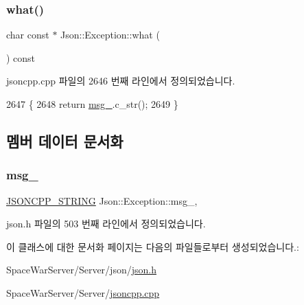 \subsubsection{\texorpdfstring{what()}{what()}}
{\footnotesize\ttfamily char const  $\ast$ Json\+::\+Exception\+::what (\begin{DoxyParamCaption}{ }\end{DoxyParamCaption}) const\hspace{0.3cm}{\ttfamily [inherited]}}



jsoncpp.\+cpp 파일의 2646 번째 라인에서 정의되었습니다.


\begin{DoxyCode}
2647 \{
2648   \textcolor{keywordflow}{return} \hyperlink{class_json_1_1_exception_aae3cbb8b45bf21480f64502a8329659f}{msg\_}.c\_str();
2649 \}
\end{DoxyCode}


\subsection{멤버 데이터 문서화}
\mbox{\label{class_json_1_1_exception_aae3cbb8b45bf21480f64502a8329659f}} 
\subsubsection{\texorpdfstring{msg\+\_\+}{msg\_}}
{\footnotesize\ttfamily \hyperlink{json_8h_a1e723f95759de062585bc4a8fd3fa4be}{J\+S\+O\+N\+C\+P\+P\+\_\+\+S\+T\+R\+I\+NG} Json\+::\+Exception\+::msg\+\_\+\hspace{0.3cm}{\ttfamily [protected]}, {\ttfamily [inherited]}}



json.\+h 파일의 503 번째 라인에서 정의되었습니다.



이 클래스에 대한 문서화 페이지는 다음의 파일들로부터 생성되었습니다.\+:\begin{DoxyCompactItemize}
\item 
Space\+War\+Server/\+Server/json/\hyperlink{json_8h}{json.\+h}\item 
Space\+War\+Server/\+Server/\hyperlink{jsoncpp_8cpp}{jsoncpp.\+cpp}\end{DoxyCompactItemize}
